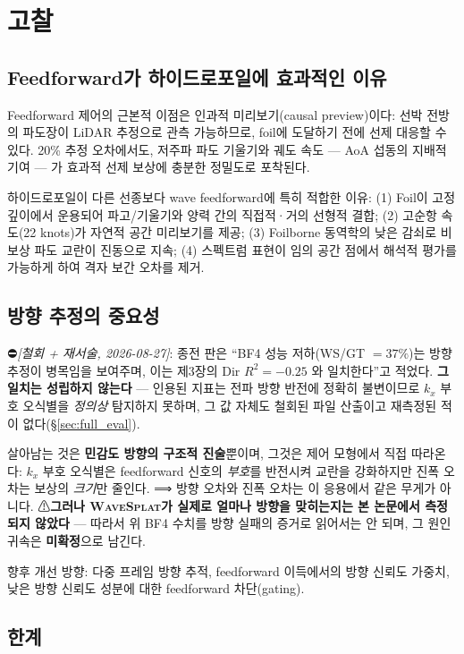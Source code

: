 \documentclass[11pt]{report}
\numberwithin{equation}{chapter}
\numberwithin{figure}{chapter}
\numberwithin{table}{chapter}
\newcommand{\WS}{\textsc{WaveSplat}}
\begin{document}
\section{고찰}
\label{sec:hydrofoil_discussion}

\subsection{Feedforward가 하이드로포일에 효과적인 이유}

Feedforward 제어의 근본적 이점은 인과적 미리보기(causal preview)이다:
선박 전방의 파도장이 LiDAR 추정으로 관측 가능하므로, foil에 도달하기 전에
선제 대응할 수 있다.
20\% 추정 오차에서도, 저주파 파도 기울기와 궤도 속도 --- AoA 섭동의
지배적 기여 --- 가 효과적 선제 보상에 충분한 정밀도로 포착된다.

하이드로포일이 다른 선종보다 wave feedforward에 특히 적합한 이유:
(1) Foil이 고정 깊이에서 운용되어 파고/기울기와 양력 간의 직접적·거의 선형적 결합;
(2) 고순항 속도(22 knots)가 자연적 공간 미리보기를 제공;
(3) Foilborne 동역학의 낮은 감쇠로 비보상 파도 교란이 진동으로 지속;
(4) 스펙트럼 표현이 임의 공간 점에서 해석적 평가를 가능하게 하여
    격자 보간 오차를 제거.

\subsection{방향 추정의 중요성}

⛔\emph{[철회 + 재서술, 2026-08-27]}: 종전 판은 ``BF4 성능 저하(WS/GT $=37\%$)는
방향 추정이 병목임을 보여주며, 이는 제3장의 Dir $R^2 = -0.25$ 와 일치한다''고 적었다.
\textbf{그 일치는 성립하지 않는다} --- 인용된 지표는 전파 방향 반전에 정확히 불변이므로
$k_x$ 부호 오식별을 \emph{정의상} 탐지하지 못하며, 그 값 자체도 철회된 파일 산출이고
재측정된 적이 없다(\S\ref{sec:full_eval}).

살아남는 것은 \textbf{민감도 방향의 구조적 진술}뿐이며, 그것은 제어 모형에서 직접 따라온다:
$k_x$ 부호 오식별은 feedforward 신호의 \emph{부호}를 반전시켜 교란을 강화하지만
진폭 오차는 보상의 \emph{크기}만 줄인다. ⟹ 방향 오차와 진폭 오차는 이 응용에서
같은 무게가 아니다. ⚠\textbf{그러나 \WS{}가 실제로 얼마나 방향을 맞히는지는
본 논문에서 측정되지 않았다} --- 따라서 위 BF4 수치를 방향 실패의 증거로 읽어서는 안 되며,
그 원인 귀속은 \textbf{미확정}으로 남긴다.

향후 개선 방향: 다중 프레임 방향 추적, feedforward 이득에서의
방향 신뢰도 가중치, 낮은 방향 신뢰도 성분에 대한 feedforward 차단(gating).

\subsection{한계}
\label{sec:hydrofoil_limits}
\end{document}
